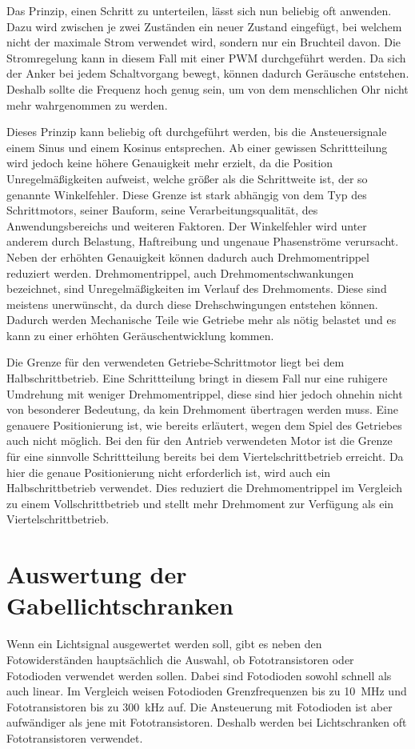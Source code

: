 Das Prinzip, einen Schritt zu unterteilen, lässt sich nun beliebig oft anwenden.
Dazu wird zwischen je zwei Zuständen ein neuer Zustand eingefügt, bei welchem nicht der maximale Strom verwendet wird, sondern nur ein Bruchteil davon.
Die Stromregelung kann in diesem Fall mit einer PWM durchgeführt werden.
Da sich der Anker bei jedem Schaltvorgang bewegt, können dadurch Geräusche entstehen.
Deshalb sollte die Frequenz hoch genug sein, um von dem menschlichen Ohr nicht mehr wahrgenommen zu werden.

Dieses Prinzip kann beliebig oft durchgeführt werden, bis die Ansteuersignale einem Sinus und einem Kosinus entsprechen.
Ab einer gewissen Schrittteilung wird jedoch keine höhere Genauigkeit mehr erzielt, da die Position Unregelmäßigkeiten aufweist, welche größer als die Schrittweite ist, der so genannte Winkelfehler.
Diese Grenze ist stark abhängig von dem Typ des Schrittmotors, seiner Bauform, seine Verarbeitungsqualität, des Anwendungsbereichs und weiteren Faktoren.
Der Winkelfehler wird unter anderem durch Belastung, Haftreibung und ungenaue Phasenströme verursacht.
Neben der erhöhten Genauigkeit können dadurch auch Drehmomentrippel reduziert werden.
Drehmomentrippel, auch Drehmomentschwankungen bezeichnet, sind Unregelmäßigkeiten im Verlauf des Drehmoments.
Diese sind meistens unerwünscht, da durch diese Drehschwingungen entstehen können.
Dadurch werden Mechanische Teile wie Getriebe mehr als nötig belastet und es kann zu einer erhöhten Geräuschentwicklung kommen.
\cite[30]{book:werkzeugmaschinen}

Die Grenze für den verwendeten Getriebe-Schrittmotor liegt bei dem Halbschrittbetrieb.
Eine Schrittteilung bringt in diesem Fall nur eine ruhigere Umdrehung mit weniger Drehmomentrippel, diese sind hier jedoch ohnehin nicht von besonderer Bedeutung, da kein Drehmoment übertragen werden muss.
Eine genauere Positionierung ist, wie bereits erläutert, wegen dem Spiel des Getriebes auch nicht möglich.
Bei den für den Antrieb verwendeten Motor ist die Grenze für eine sinnvolle Schrittteilung bereits bei dem Viertelschrittbetrieb erreicht.
Da hier die genaue Positionierung nicht erforderlich ist, wird auch ein Halbschrittbetrieb verwendet.
Dies reduziert die Drehmomentrippel im Vergleich zu einem Vollschrittbetrieb und stellt mehr Drehmoment zur Verfügung als ein Viertelschrittbetrieb.

\section{Auswertung der Gabellichtschranken}
Wenn ein Lichtsignal ausgewertet werden soll, gibt es neben den Fotowiderständen hauptsächlich die Auswahl, ob Fototransistoren oder Fotodioden verwendet werden sollen.
Dabei sind Fotodioden sowohl schnell als auch linear.
Im Vergleich weisen Fotodioden Grenzfrequenzen bis zu 10~MHz und Fototransistoren bis zu 300~kHz auf. \cite[1199]{book:halbleiterSchaltungstechnik}
Die Ansteuerung mit Fotodioden ist aber aufwändiger als jene mit Fototransistoren.
Deshalb werden bei Lichtschranken oft Fototransistoren verwendet.

